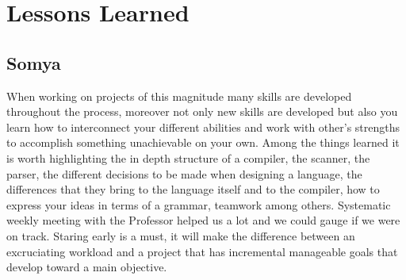 \documentclass[./Report_main.tex]{subfiles}
\begin{document}


\chapter{Lessons Learned}
\section{Somya}
When working on projects of this magnitude many skills are developed throughout the
process, moreover not only new skills are developed but also you learn how to interconnect
your different abilities and work with other's strengths to accomplish something unachievable on
your own.
Among the things learned it is worth highlighting the in depth structure of a compiler, the
scanner, the parser, the different decisions to be made when designing a language, the
differences that they bring to the language itself and to the compiler, how to express your ideas
in terms of a grammar, teamwork among others.
Systematic weekly meeting with the Professor helped us a lot and we could gauge if we were on track. Staring early is a must, it will make the difference between an excruciating workload and a
project that has incremental manageable goals that develop toward a main objective.
\end{document}
